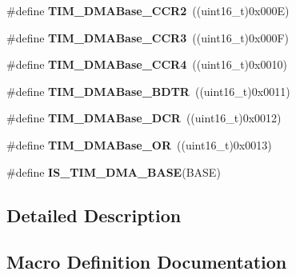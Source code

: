 \begin{DoxyCompactItemize}
\item 
\hypertarget{group___t_i_m___d_m_a___base__address_ga0e2150dcd3afe31ecb793aa471b3b972}{}\#define {\bfseries T\+I\+M\+\_\+\+D\+M\+A\+Base\+\_\+\+C\+C\+R2}~((uint16\+\_\+t)0x000\+E)\label{group___t_i_m___d_m_a___base__address_ga0e2150dcd3afe31ecb793aa471b3b972}

\item 
\hypertarget{group___t_i_m___d_m_a___base__address_ga590c90085bd2b206b941dff2731fed74}{}\#define {\bfseries T\+I\+M\+\_\+\+D\+M\+A\+Base\+\_\+\+C\+C\+R3}~((uint16\+\_\+t)0x000\+F)\label{group___t_i_m___d_m_a___base__address_ga590c90085bd2b206b941dff2731fed74}

\item 
\hypertarget{group___t_i_m___d_m_a___base__address_ga5e84a16e7d8ea369a3a55bb6fe1f2171}{}\#define {\bfseries T\+I\+M\+\_\+\+D\+M\+A\+Base\+\_\+\+C\+C\+R4}~((uint16\+\_\+t)0x0010)\label{group___t_i_m___d_m_a___base__address_ga5e84a16e7d8ea369a3a55bb6fe1f2171}

\item 
\hypertarget{group___t_i_m___d_m_a___base__address_gaaff22bbf3091c47783c1c68b648c8605}{}\#define {\bfseries T\+I\+M\+\_\+\+D\+M\+A\+Base\+\_\+\+B\+D\+T\+R}~((uint16\+\_\+t)0x0011)\label{group___t_i_m___d_m_a___base__address_gaaff22bbf3091c47783c1c68b648c8605}

\item 
\hypertarget{group___t_i_m___d_m_a___base__address_ga59e2206e4e03b9d55c9fb5a24e29b01c}{}\#define {\bfseries T\+I\+M\+\_\+\+D\+M\+A\+Base\+\_\+\+D\+C\+R}~((uint16\+\_\+t)0x0012)\label{group___t_i_m___d_m_a___base__address_ga59e2206e4e03b9d55c9fb5a24e29b01c}

\item 
\hypertarget{group___t_i_m___d_m_a___base__address_gad6a75d19df73bae091a0e649fba7339c}{}\#define {\bfseries T\+I\+M\+\_\+\+D\+M\+A\+Base\+\_\+\+O\+R}~((uint16\+\_\+t)0x0013)\label{group___t_i_m___d_m_a___base__address_gad6a75d19df73bae091a0e649fba7339c}

\item 
\#define {\bfseries I\+S\+\_\+\+T\+I\+M\+\_\+\+D\+M\+A\+\_\+\+B\+A\+S\+E}(B\+A\+S\+E)
\end{DoxyCompactItemize}


\subsection{Detailed Description}


\subsection{Macro Definition Documentation}
\hypertarget{group___t_i_m___d_m_a___base__address_gaf565551f2619b1368fed7ef1ba7414de}{}
